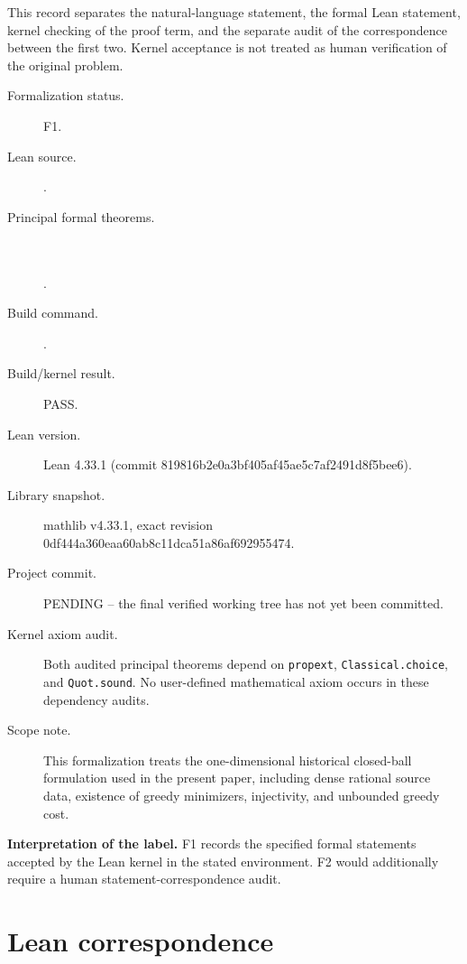 \documentclass[11pt]{amsart}
\theoremstyle{definition}
\theoremstyle{remark}
\begin{document}
\begingroup\small\sloppy
This record separates the natural-language statement, the formal Lean statement, kernel checking of the proof term, and the separate audit of the correspondence between the first two. Kernel acceptance is not treated as human verification of the original problem.

\begin{description}
\item[Formalization status.] F1.
\item[Lean source.] \texttt{}.
\item[Principal formal theorems.] \mbox{}\\
\texttt{}\\
\texttt{}.
\item[Build command.] \texttt{}.
\item[Build/kernel result.] PASS.
\item[Lean version.] Lean 4.33.1 (commit 819816b2e0a3bf405af45ae5c7af2491d8f5bee6).
\item[Library snapshot.] mathlib v4.33.1, exact revision 0df444a360eaa60ab8c11dca51a86af692955474.
\item[Project commit.] PENDING -- the final verified working tree has not yet been committed.
\item[Kernel axiom audit.] Both audited principal theorems depend on \texttt{propext}, \texttt{Classical.choice}, and \texttt{Quot.sound}. No user-defined mathematical axiom occurs in these dependency audits.
\item[Scope note.] This formalization treats the one-dimensional historical closed-ball formulation used in the present paper, including dense rational source data, existence of greedy minimizers, injectivity, and unbounded greedy cost.
\end{description}

\noindent\textbf{Interpretation of the label.} F1 records the specified formal statements accepted by the Lean kernel in the stated environment. F2 would additionally require a human statement-correspondence audit.
\endgroup

\section{Lean correspondence}
\end{document}
